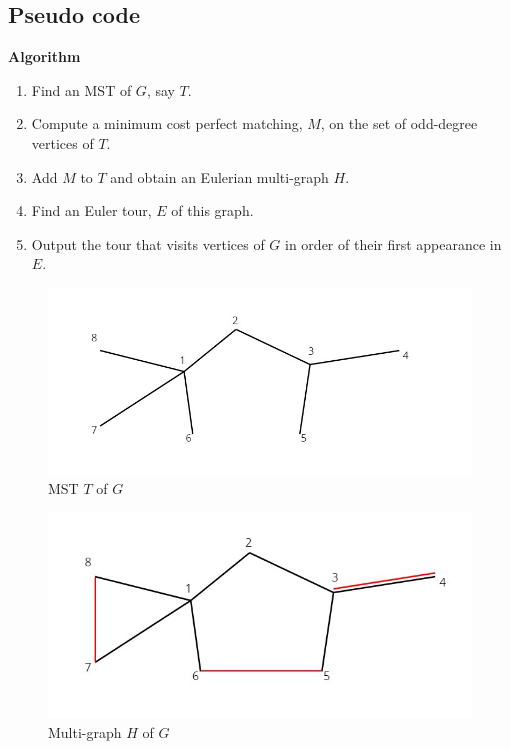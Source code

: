 \subsection{Pseudo code}
\textbf{Algorithm}
\begin{enumerate}
    \item{
        Find an MST of $G$, say $T$.        
    }
    \item {Compute a minimum cost perfect matching, $M$, on the set of odd-degree vertices of $T$.}
    \item {
        Add $M$ to $T$ and obtain an Eulerian multi-graph $H$.
    }
    \item {Find an Euler tour, $E$ of this graph.
    }
    \item {Output the tour that visits vertices of $G$ in order of their first appearance in $E$.}
\end{enumerate}
\begin{figure}[h]
    \centering
    \caption{MST $T$ of $G$}
    \includegraphics[scale=0.4]{1.jpg}
\end{figure}        
\begin{figure}[h]
    \centering
    \caption{Multi-graph $H$ of $G$}
    \includegraphics[scale=0.4]{2.jpg}
\end{figure}
